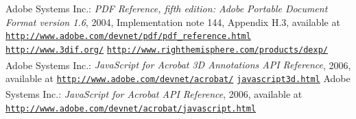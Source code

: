 \documentclass[a4paper]{article}
\begin{document}
\begin{thebibliography}{9}
   Adobe Systems Inc.: \emph{PDF Reference, fifth edition: Adobe Portable Document Format version 1.6}, 2004, Implementation note 144, Appendix H.3, available at \href{http://www.adobe.com/devnet/pdf/pdf_reference.html}{\tt http://www.adobe.com/devnet/pdf/pdf\_reference.html}
   \href{http://www.3dif.org/}{\tt http://www.3dif.org/}
   \href{http://www.righthemisphere.com/products/dexp/}{\tt http://www.righthemisphere.com/products/dexp/}
    Adobe Systems Inc.: \emph{JavaScript for Acrobat\textsuperscript{\scriptsize\textregistered} 3D Annotations API Ref\-er\-ence}, 2006, available at \href{http://www.adobe.com/devnet/acrobat/javascript3d.html}{\tt http://www.adobe.com/devnet/acrobat/} \href{http://www.adobe.com/devnet/acrobat/javascript3d.html}{\tt javascript3d.html}
    Adobe Systems Inc.: \emph{JavaScript for Acrobat\textsuperscript{\scriptsize\textregistered} API Reference}, 2006, available at \href{http://www.adobe.com/devnet/acrobat/javascript.html}{\tt http://www.adobe.com/devnet/acrobat/javascript.html}
\end{thebibliography}
\end{document}
